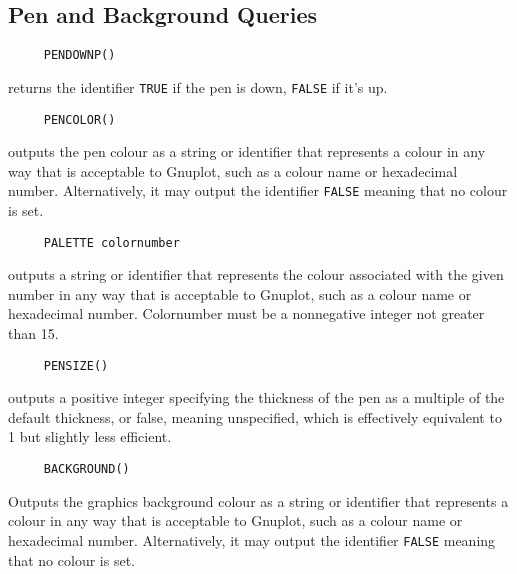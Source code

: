 \subsection{Pen and Background Queries}

\begin{verbatim}
     PENDOWNP()
\end{verbatim}
returns the identifier \texttt{TRUE} if the pen is down,
\texttt{FALSE} if it's up.


\begin{verbatim}
     PENCOLOR()
\end{verbatim}
outputs the pen colour as a string or identifier that represents a
colour in any way that is acceptable to Gnuplot, such as a colour name
or hexadecimal number.  Alternatively, it may output the identifier
\texttt{FALSE} meaning that no colour is set.

\begin{verbatim}
     PALETTE colornumber
\end{verbatim}
outputs a string or identifier that represents the colour associated
with the given number in any way that is acceptable to Gnuplot, such
as a colour name or hexadecimal number.  Colornumber must be a
nonnegative integer not greater than 15.

\begin{verbatim}
     PENSIZE()
\end{verbatim}
outputs a positive integer specifying the thickness of the pen as a
multiple of the default thickness, or false, meaning unspecified,
which is effectively equivalent to 1 but slightly less efficient.




\begin{verbatim}
     BACKGROUND()
\end{verbatim}
Outputs the graphics background colour as a string or identifier that
represents a colour in any way that is acceptable to Gnuplot, such as
a colour name or hexadecimal number.  Alternatively, it may output the
identifier \texttt{FALSE} meaning that no colour is set.


